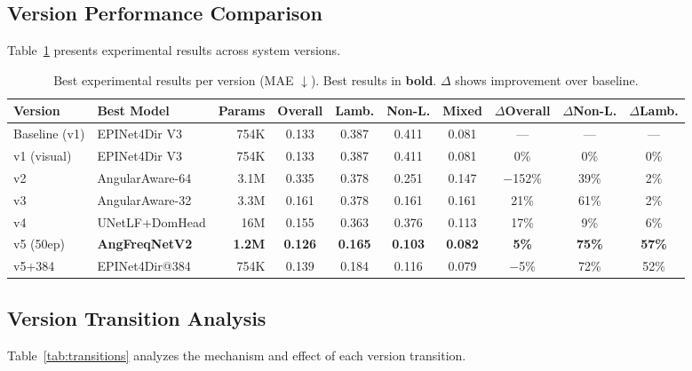 \documentclass[11pt,a4paper]{article}
\begin{document}
\subsection{Version Performance Comparison}

Table~\ref{tab:results} presents experimental results across system versions.

\begin{table}[t]
\centering
\footnotesize
\setlength{\tabcolsep}{4pt}
\begin{tabular}{@{}llrccccccc@{}}
\toprule
\textbf{Version} & \textbf{Best Model} & \textbf{Params} & \textbf{Overall} & \textbf{Lamb.} & \textbf{Non-L.} & \textbf{Mixed} & $\Delta$\textbf{Overall} & $\Delta$\textbf{Non-L.} & $\Delta$\textbf{Lamb.} \\
\midrule
Baseline (v1) & EPINet4Dir V3 & 754K & 0.133 & 0.387 & 0.411 & 0.081 & --- & --- & --- \\
v1 (visual)   & EPINet4Dir V3 & 754K & 0.133 & 0.387 & 0.411 & 0.081 & 0\% & 0\% & 0\% \\
v2            & AngularAware-64 & 3.1M & 0.335 & 0.378 & 0.251 & 0.147 & $-$152\% & 39\% & 2\% \\
v3            & AngularAware-32 & 3.3M & 0.161 & 0.378 & 0.161 & 0.161 & 21\% & 61\% & 2\% \\
v4            & UNetLF+DomHead  & 16M  & 0.155 & 0.363 & 0.376 & 0.113 & 17\% & 9\% & 6\% \\
v5 (50ep)     & \textbf{AngFreqNetV2} & \textbf{1.2M} & \textbf{0.126} & \textbf{0.165} & \textbf{0.103} & \textbf{0.082} & \textbf{5\%} & \textbf{75\%} & \textbf{57\%} \\
v5+384        & EPINet4Dir@384 & 754K & 0.139 & 0.184 & 0.116 & 0.079 & $-$5\% & 72\% & 52\% \\
\bottomrule
\end{tabular}
\caption{Best experimental results per version (MAE $\downarrow$). Best results in \textbf{bold}.
$\Delta$ shows improvement over baseline.}
\label{tab:results}
\end{table}

\subsection{Version Transition Analysis}

Table~\ref{tab:transitions} analyzes the mechanism and effect of each version transition.
\end{document}
